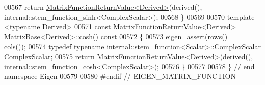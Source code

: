 \begin{DoxyCode}
00567   \textcolor{keywordflow}{return} \hyperlink{class_eigen_1_1_matrix_function_return_value}{MatrixFunctionReturnValue<Derived>}(derived(), 
      internal::stem\_function\_sinh<ComplexScalar>);
00568 \}
00569 
00570 \textcolor{keyword}{template} <\textcolor{keyword}{typename} Derived>
00571 \textcolor{keyword}{const} \hyperlink{class_eigen_1_1_matrix_function_return_value}{MatrixFunctionReturnValue<Derived>} 
      \hyperlink{group___core___module_class_eigen_1_1_matrix_base}{MatrixBase<Derived>::cosh}()\textcolor{keyword}{ const}
00572 \textcolor{keyword}{}\{
00573   eigen\_assert(rows() == cols());
00574   \textcolor{keyword}{typedef} \textcolor{keyword}{typename} internal::stem\_function<Scalar>::ComplexScalar ComplexScalar;
00575   \textcolor{keywordflow}{return} \hyperlink{class_eigen_1_1_matrix_function_return_value}{MatrixFunctionReturnValue<Derived>}(derived(), 
      internal::stem\_function\_cosh<ComplexScalar>);
00576 \}
00577 
00578 \} \textcolor{comment}{// end namespace Eigen}
00579 
00580 \textcolor{preprocessor}{#endif // EIGEN\_MATRIX\_FUNCTION}
\end{DoxyCode}
